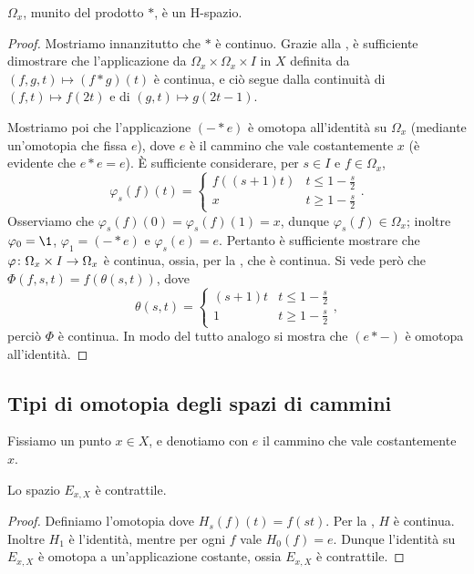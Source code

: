 \begin{proposition}
$\Omega_x$, munito del prodotto $\ast$, è un H-spazio.
\end{proposition}
\begin{proof}
Mostriamo innanzitutto che $\ast$ è continuo. Grazie alla , è sufficiente dimostrare che l'applicazione da $\Omega_x\times\Omega_x\times I$ in $X$ definita da $(f,g,t)\mapsto (f\ast g)(t)$ è continua, e ciò segue dalla continuità di $(f,t)\mapsto f(2t)$ e di $(g,t)\mapsto g(2t-1)$.

Mostriamo poi che l'applicazione $(-\ast e)$
è omotopa all'identità su $\Omega_x$ (mediante un'omotopia che fissa $e$), dove $e$ è il cammino che vale costantemente $x$ (è evidente che $e\ast e=e$). È sufficiente considerare, per $s\in I$ e $f\in\Omega_x$, 
$$
\varphi_s(f)(t)=
\begin{cases}
f((s+1)t)&t\le 1-\frac{s}{2}\\
x&t\ge 1-\frac{s}{2}
\end{cases}.
$$
Osserviamo che $\varphi_s(f)(0)=\varphi_s(f)(1)=x$, dunque $\varphi_s(f)\in\Omega_x$; inoltre $\varphi_0=\1$, $\varphi_1=(-\ast e)$ e $\varphi_s(e)=e$. Pertanto è sufficiente mostrare che $\varphi\colon\Omega_x\times I\to\Omega_x$ è continua, ossia, per la , che
è continua. Si vede però che $\Phi(f,s,t)=f(\theta(s,t))$, dove
$$
\theta(s,t)=
\begin{cases}
(s+1)t&t\le 1-\frac{s}{2}\\
1&t\ge 1-\frac{s}{2}
\end{cases},
$$
perciò $\Phi$ è continua. In modo del tutto analogo si mostra che $(e\ast-)$ è omotopa all'identità.
\end{proof}

\subsection{Tipi di omotopia degli spazi di cammini}

Fissiamo un punto $x\in X$, e denotiamo con $e$ il cammino che vale costantemente $x$.

\begin{proposition}
Lo spazio $E_{x,X}$ è contrattile.
\end{proposition}
\begin{proof}
Definiamo l'omotopia
dove $H_s(f)(t)=f(st)$. Per la , $H$ è continua. Inoltre $H_1$ è l'identità, mentre per ogni $f$ vale $H_0(f)=e$. Dunque l'identità su $E_{x,X}$ è omotopa a un'applicazione costante, ossia $E_{x,X}$ è contrattile.
\end{proof}

